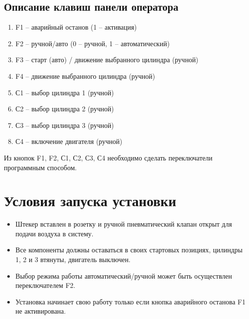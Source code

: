\subsection{Описание клавиш панели оператора}
\begin{enumerate}
    \item F1 -- аварийный останов (1 – активация)
    \item F2 -- ручной/авто (0 – ручной, 1 – автоматический)
    \item F3 -- старт (авто) / движение выбранного цилиндра (ручной)
    \item F4 -- движение выбранного цилиндра (ручной)
    \item С1 -- выбор цилиндра 1 (ручной)
    \item С2 -- выбор цилиндра 2 (ручной)
    \item С3 -- выбор цилиндра 3 (ручной)
    \item С4 -- включение двигателя (ручной)
\end{enumerate}

Из кнопок F1, F2, С1, С2, С3, С4 необходимо сделать переключатели
программным способом.

\section{Условия запуска установки}
\begin{itemize}
    \item Штекер вставлен в розетку и ручной пневматический клапан открыт для подачи воздуха в систему.
    \item Все компоненты должны оставаться в своих стартовых позициях, цилиндры 1, 2 и 3 втянуты, двигатель выключен.
    \item Выбор режима работы автоматический/ручной может быть осуществлен переключателем F2.
    \item Установка начинает свою работу только если кнопка аварийного останова F1 не активирована.
\end{itemize}



